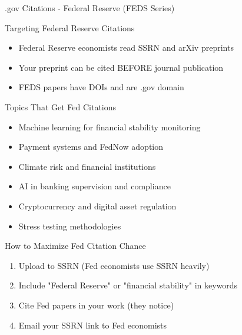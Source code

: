 \documentclass[11pt]{beamer}
\begin{document}
	\begin{frame}{.gov Citations - Federal Reserve (FEDS Series)}
		\scriptsize
		\begin{block}{Targeting Federal Reserve Citations}
			\begin{itemize}
				\item Federal Reserve economists read SSRN and arXiv preprints
				\item Your preprint can be cited BEFORE journal publication
				\item FEDS papers have DOIs and are .gov domain
			\end{itemize}
		\end{block}
		\begin{block}{Topics That Get Fed Citations}
			\begin{itemize}
				\item Machine learning for financial stability monitoring
				\item Payment systems and FedNow adoption
				\item Climate risk and financial institutions
				\item AI in banking supervision and compliance
				\item Cryptocurrency and digital asset regulation
				\item Stress testing methodologies
			\end{itemize}
		\end{block}
		\begin{block}{How to Maximize Fed Citation Chance}
			\begin{enumerate}
				\item Upload to SSRN (Fed economists use SSRN heavily)
				\item Include "Federal Reserve" or "financial stability" in keywords
				\item Cite Fed papers in your work (they notice)
				\item Email your SSRN link to Fed economists
			\end{enumerate}
		\end{block}
	\end{frame}
	
\end{document}
